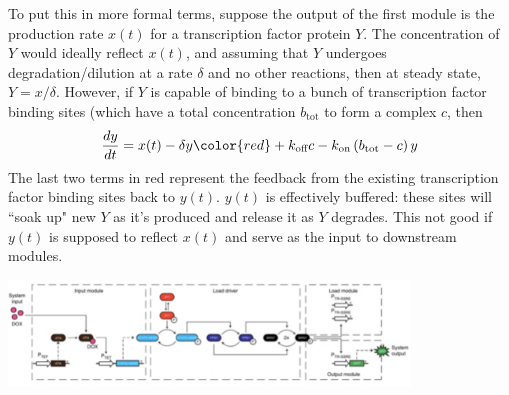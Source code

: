 \documentclass{article}
\begin{document}
To put this in more formal terms, suppose the output of the first module is the production rate $x(t)$ for a transcription factor protein $Y$. The concentration of $Y$ would ideally reflect $x(t)$, and assuming that $Y$ undergoes degradation/dilution at a rate $\delta$ and no other reactions, then at steady state, $Y=x/\delta$. However, if $Y$ is capable of binding to a bunch of transcription factor binding sites (which have a total concentration $b_{\textrm{tot}}$ to form a complex $c$, then
\[ \frac{dy}{dt} = x(t) - \delta y { \color{red} + k_{\textrm{off}} c - k_{\textrm{on}} \left( b_{\textrm{tot}} - c \right) y } \]
The last two terms in red represent the feedback from the existing transcription factor binding sites back to $y(t)$. $y(t)$ is effectively buffered: these sites will ``soak up" new $Y$ as it's produced and release it as $Y$ degrades. This not good if $y(t)$ is supposed to reflect $x(t)$ and serve as the input to downstream modules.

\begin{center}
\includegraphics[width=0.8\textwidth]{buffered_diagram.pdf}
\end{center}
\end{document}
